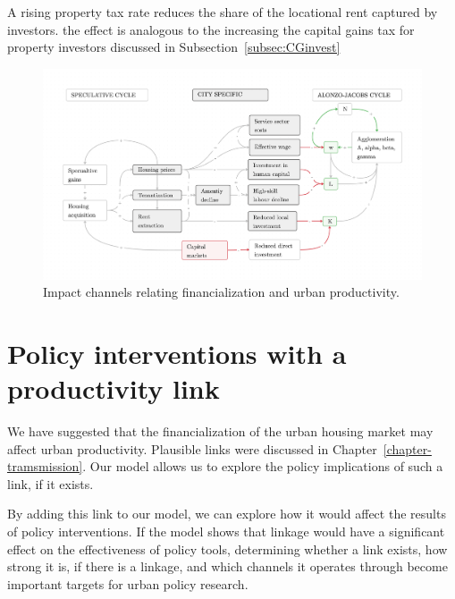 A rising property tax rate reduces the share of the locational rent captured by investors. the effect is analogous to the  increasing the capital gains tax for property investors discussed in Subsection~\ref{subsec:CGinvest}


\begin{figure}[h!tb]\label{fig-impact-channels2}
\begin{adjustwidth}{-0.24\textwidth}{-0.24\textwidth}
\centering
\includegraphics[scale=.15 ]{fig/impact-channels.png}%
\end{adjustwidth}
\caption{Impact channels relating financialization and urban productivity.}
\end{figure}


\section{Policy interventions with a productivity link}


We have suggested that the financialization of the urban housing market may affect urban productivity. Plausible links were discussed in Chapter~\ref{chapter-tramsmission}. Our model allows us to explore the policy implications of such a link, if it exists. 


By adding this link to our model, we can explore how it would affect the results of policy interventions. If the model shows that linkage would have a significant effect on the effectiveness of policy tools, determining whether a link exists, how strong it is, if there is a linkage, and which channels it operates through become important targets for urban policy research.



